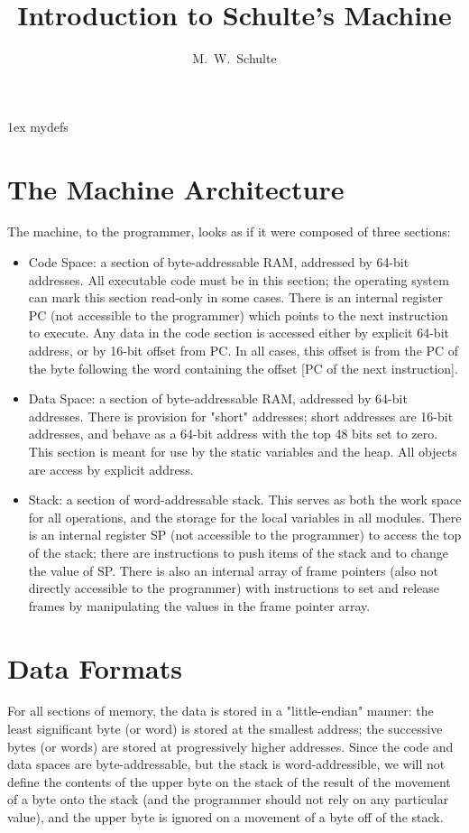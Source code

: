 \documentclass{article}
\author {M.~W.~Schulte}
\title {Introduction to Schulte's Machine}
\begin{document}
 \parindent 0pt \parskip 1ex
 {mydefs}\fullpage
\section{The Machine Architecture}
The machine, to the programmer, looks as if it were composed of
three sections:\begin {itemize}
\item Code Space:
a section of byte-addressable RAM, addressed by 64-bit addresses.
All executable code must be in this section; the operating
system can mark this section read-only in some cases.
There is an internal register PC (not accessible to the programmer)
which points to the next instruction to execute.
Any data in the code section is accessed
either by explicit 64-bit address, or by 16-bit offset from PC.
In all cases, this offset is from the PC of the byte following the word
containing the offset [PC of the next instruction].
\item Data Space:
a section of byte-addressable RAM, addressed by 64-bit addresses.
There is provision for "short" addresses;  short addresses are 16-bit
addresses, and behave as a 64-bit address with the top 48 bits set to zero.
This section is meant for use by the static variables and the heap.
All objects are access by explicit address.
\item Stack: a section of word-addressable stack.
This serves as both the work space for all operations, and the storage
for the local variables in all modules.
There is an internal register SP (not accessible to the programmer)
to access the top of the stack; there are instructions to
push items of the stack and to change the value of SP.
There is also an internal array of frame pointers (also not directly
accessible to the programmer) with instructions to set and release frames
by manipulating the values in the frame pointer array.
\end{itemize}

\section{Data Formats}
For all sections of memory, the data is stored in a "little-endian" manner:
the least significant byte (or word) is stored at the smallest address;
the successive bytes (or words) are stored at progressively higher
addresses.  Since the code and data spaces are byte-addressable, but the
stack is word-addressible, we will not define the contents of the upper
byte on the stack of the result of the movement of a byte onto the stack
(and the programmer should not rely on any particular value),
and the upper byte is ignored on a movement of a byte off of the stack.
\end{document}
